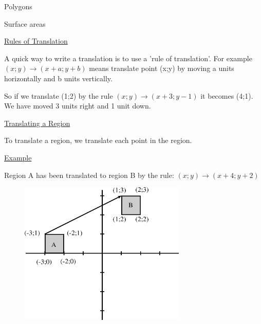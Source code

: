 \begin{exercises}{Polygons}
\begin{exercises}{Surface areas }
{\begin{mdframed}[linewidth=4, leftmargin=40, rightmargin=40]
\begin{exercise}
    \end{exercise}
    \end{mdframed}
    }
    \noindent
  
          \label{m39358*id72402}
            \uline{Rules of Translation}
          \par 
          \label{m39358*id72409}A quick way to write a translation is to use a 'rule of translation'. For example $\left(x;y\right)\to \left(x+a;y+b\right)$ means translate point (x;y) by moving a units horizontally and b units vertically.\par 
          \label{m39358*id72456}So if we translate (1;2) by the rule $\left(x;y\right)\to \left(x+3;y-1\right)$ it becomes (4;1). We have moved 3 units right and 1 unit down.\par 
          \label{m39358*id72503}
            \uline{Translating a Region}
          \par 
          \label{m39358*id72511}To translate a region, we translate each point in the region.\par 
          \label{m39358*id72517}
            \uline{Example}
          \par 
          \label{m39358*id72526}Region A has been translated to region B by the rule: $\left(x;y\right)\to \left(x+4;y+2\right)$\par 
          \label{m39358*id72572}
            
    \setcounter{subfigure}{0}


	\begin{figure}[H] %
    \begin{center}
    \label{m39358*id72575!!!underscore!!!media}\label{m39358*id72575!!!underscore!!!printimage}\includegraphics[width=300px]{col11306.imgs/m39358_MG10C14_031.png} %
        
      \vspace{2pt}
    \vspace{.1in}
    

\end{center}
\end{figure}
\end{exercises}
\end{exercises}
